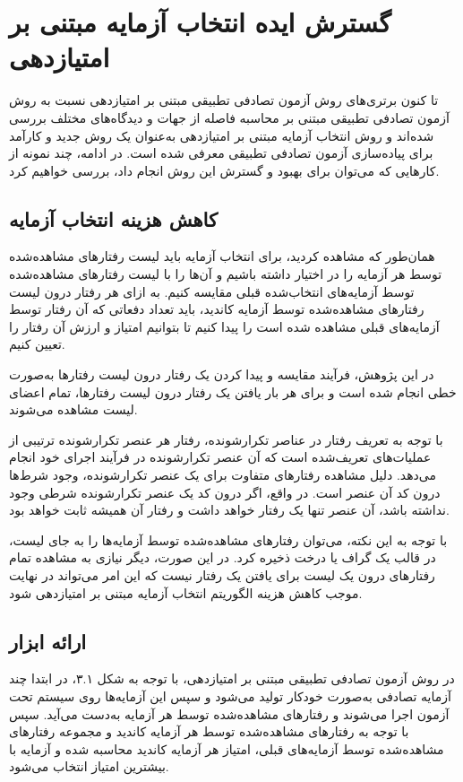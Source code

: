 \section{گسترش ایده انتخاب آزمایه مبتنی بر امتیازدهی}

تا کنون برتری‌های روش آزمون تصادفی تطبیقی مبتنی بر امتیازدهی نسبت به روش آزمون تصادفی تطبیقی مبتنی بر محاسبه فاصله از جهات و دیدگاه‌های مختلف بررسی شده‌اند و روش انتخاب آزمایه مبتنی بر امتیازدهی به‌عنوان یک روش جدید و کارآمد برای پیاده‌سازی آزمون تصادفی تطبیقی معرفی شده است. در ادامه، چند نمونه از کارهایی که می‌توان برای بهبود و گسترش این روش انجام داد، بررسی خواهیم کرد.

\subsection{کاهش هزینه انتخاب آزمایه}

همان‌طور که مشاهده کردید، برای انتخاب آزمایه باید لیست رفتارهای مشاهده‌شده توسط هر آزمایه را در اختیار داشته باشیم و آن‌ها را با لیست رفتارهای مشاهده‌شده توسط آزمایه‌های انتخاب‌شده قبلی مقایسه کنیم. به ازای هر رفتار درون لیست رفتارهای مشاهده‌شده توسط آزمایه کاندید، باید تعداد دفعاتی که آن رفتار توسط آزمایه‌های قبلی مشاهده شده است را پیدا کنیم تا بتوانیم امتیاز و ارزش آن رفتار را تعیین کنیم.

در این پژوهش، فرآیند مقایسه و پیدا کردن یک رفتار درون لیست رفتارها به‌صورت خطی انجام شده است و برای هر بار یافتن یک رفتار درون لیست رفتارها، تمام اعضای لیست مشاهده می‌شوند.

با توجه به تعریف رفتار در عناصر تکرارشونده، رفتار هر عنصر تکرارشونده ترتیبی از عملیات‌های تعریف‌شده است که آن عنصر تکرارشونده در فرآیند اجرای خود انجام می‌دهد. دلیل مشاهده رفتارهای متفاوت برای یک عنصر تکرارشونده، وجود شرط‌ها درون کد آن عنصر است. در واقع، اگر درون کد یک عنصر تکرارشونده شرطی وجود نداشته باشد، آن عنصر تنها یک رفتار خواهد داشت و رفتار آن همیشه ثابت خواهد بود.

با توجه به این نکته، می‌توان رفتارهای مشاهده‌شده توسط آزمایه‌ها را به جای لیست، در قالب یک گراف یا درخت ذخیره کرد. در این صورت، دیگر نیازی به مشاهده تمام رفتارهای درون یک لیست برای یافتن یک رفتار نیست که این امر می‌تواند در نهایت موجب کاهش هزینه الگوریتم انتخاب آزمایه مبتنی بر امتیازدهی شود.

\subsection{ارائه ابزار}

در روش آزمون تصادفی تطبیقی مبتنی بر امتیازدهی، با توجه به شکل ۳.۱، در ابتدا چند آزمایه تصادفی به‌صورت خودکار تولید می‌شود و سپس این آزمایه‌ها روی سیستم تحت آزمون اجرا می‌شوند و رفتارهای مشاهده‌شده توسط هر آزمایه به‌دست می‌آید. سپس با توجه به رفتارهای مشاهده‌شده توسط هر آزمایه کاندید و مجموعه رفتارهای مشاهده‌شده توسط آزمایه‌های قبلی، امتیاز هر آزمایه کاندید محاسبه شده و آزمایه با بیشترین امتیاز انتخاب می‌شود.

